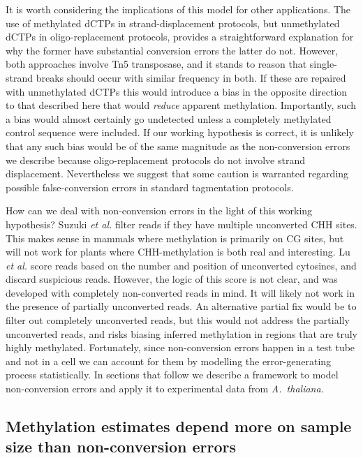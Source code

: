 \documentclass[10pt,letterpaper]{article}
\begin{document}
It is worth considering the implications of this model for other applications.
The use of methylated dCTPs in strand-displacement protocols, but unmethylated dCTPs in oligo-replacement protocols, provides a straightforward explanation for why the former have substantial conversion errors the latter do not.
However, both approaches involve Tn5 transposase, and it stands to reason that single-strand breaks should occur with similar frequency in both.
If these are repaired with unmethylated dCTPs this would introduce a bias in the opposite direction to that described here that would \textit{reduce} apparent methylation.
Importantly, such a bias would almost certainly go undetected unless a completely methylated control sequence were included.
If our working hypothesis is correct, it is unlikely that any such bias would be of the same magnitude as the non-conversion errors we describe because oligo-replacement protocols do not involve strand displacement.
Nevertheless we suggest that some caution is warranted regarding possible false-conversion errors in standard tagmentation protocols.

How can we deal with non-conversion errors in the light of this working hypothesis?
Suzuki \textit{et al.}\cite{suzuki2018whole} filter reads if they have multiple unconverted CHH sites.
This makes sense in mammals where methylation is primarily on CG sites, but will not work for plants where CHH-methylation is both real and interesting.
Lu \textit{et al.} \cite{lu2015improved} score reads based on the number and position of unconverted cytosines, and discard suspicious reads.
However, the logic of this score is not clear, and was developed with completely non-converted reads in mind.
It will likely not work in the presence of partially unconverted reads.
An alternative partial fix would be to filter out completely unconverted reads, but this would not address the partially unconverted reads, and risks biasing inferred methylation in regions that are truly highly methylated.
Fortunately, since non-conversion errors happen in a test tube and not in a cell we can account for them by modelling the error-generating process statistically.
In sections that follow we describe a framework to model non-conversion errors and apply it to experimental data from \emph{A.~thaliana}.

\subsection*{Methylation estimates depend more on sample size than non-conversion errors}
\end{document}
